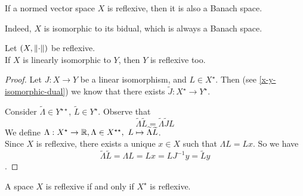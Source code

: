 \begin{prop}
	If a normed vector space $X$ is reflexive, then it is also a Banach space.
\end{prop}

Indeed, $X$ is isomorphic to its bidual, which is always a Banach space.

\begin{theo} \label{theo-lin-iso-reflex}
	Let $(X,\left\lVert\cdot\right\rVert)$ be reflexive. \\
	If $X$ is linearly isomorphic to $Y$, then $Y$ is reflexive too.
\end{theo}

\begin{proof}
	Let $J:X \to Y$ be a linear isomorphism, and $L \in X^\star$. Then (see \vref{x-y-isomorphic-dual}) we know that there exists $\tilde J:X^\star \to Y^\star$.
	
	Consider $\tilde \Lambda \in Y^{\star\star}$, $\tilde L \in Y^{\star}$. Observe that
	$$
		\tilde \Lambda \tilde L = \tilde \Lambda \tilde J L
	$$
	We define $\Lambda : X^\star \to \mathbb R, \Lambda \in X^{\star\star}, \ L\mapsto \widetilde \Lambda \widetilde L$.\\
	Since $X$ is reflexive, there exists a unique $x \in X$ such that $\Lambda L = L x$. So we have
	$$
		\tilde \Lambda \tilde L = \Lambda L = L x = L J ^{-1} y = \tilde L y
	$$.
\end{proof}

\begin{theo}\label{theo-x-ref-iff-x-star-ref}
	A space $X$ is reflexive if and only if $X^{\star}$ is reflexive.
\end{theo}

